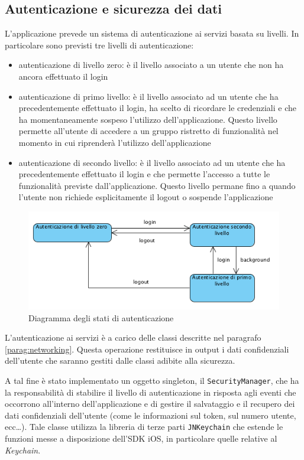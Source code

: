 \subsection{Autenticazione e sicurezza dei dati}
L'applicazione prevede un sistema di autenticazione ai servizi basata su livelli. In particolare sono previsti tre livelli di autenticazione:
\begin{itemize}
 \item autenticazione di livello zero: è il livello associato a un utente che non ha ancora effettuato il login
 \item autenticazione di primo livello: è il livello associato ad un utente che ha precedentemente effettuato il login, ha scelto di ricordare le credenziali e che ha momentaneamente sospeso l'utilizzo dell'applicazione. Questo livello permette all'utente di accedere a un gruppo ristretto di funzionalità nel momento in cui riprenderà l'utilizzo dell'applicazione
 \item autenticazione di secondo livello: è il livello associato ad un utente che ha precedentemente effettuato il login e che permette l'accesso a tutte le funzionalità previste dall'applicazione. Questo livello permane fino a quando l'utente non richiede esplicitamente il logout o sospende l'applicazione
\end{itemize}

\begin{figure}[!htbp]
\centering
\includegraphics[scale=0.70]{architettura/stati.png}
\caption{Diagramma degli stati di autenticazione}
\end{figure}


L'autenticazione ai servizi è a carico delle classi descritte nel paragrafo \ref{parag:networking}. Questa operazione restituisce in output i dati confidenziali dell'utente che saranno gestiti dalle classi adibite alla sicurezza.

A tal fine è stato implementato un oggetto singleton, il \texttt{SecurityManager}, che ha la responsabilità di stabilire il livello di autenticazione in risposta agli eventi che occorrono all'interno dell'applicazione e di gestire il salvataggio e il recupero dei dati confidenziali dell'utente (come le informazioni sul token, sul numero utente, ecc\dots). Tale classe utilizza la libreria di terze parti \texttt{JNKeychain} che estende le funzioni messe a disposizione dell'SDK iOS, in particolare quelle relative al \emph{Keychain}. 

